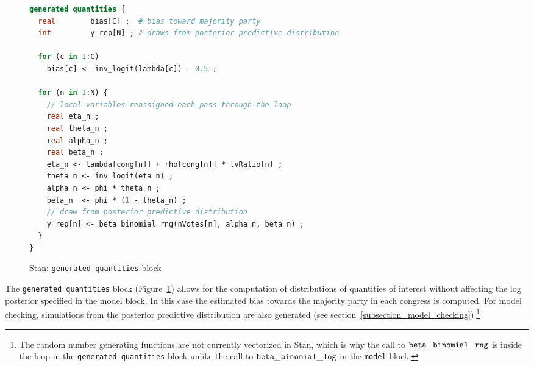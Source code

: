 \begin{figure}[h]
\begin{lstlisting}[language=Stan, frame=trBL]
generated quantities {
  real        bias[C] ;  # bias toward majority party
  int         y_rep[N] ; # draws from posterior predictive distribution
  
  for (c in 1:C) 
    bias[c] <- inv_logit(lambda[c]) - 0.5 ;
  
  for (n in 1:N) {
    // local variables reassigned each pass through the loop
    real eta_n ;
    real theta_n ;
    real alpha_n ;
    real beta_n ;
    eta_n <- lambda[cong[n]] + rho[cong[n]] * lvRatio[n] ;
    theta_n <- inv_logit(eta_n) ;    
    alpha_n <- phi * theta_n ;
    beta_n  <- phi * (1 - theta_n) ;
    // draw from posterior predictive distribution
    y_rep[n] <- beta_binomial_rng(nVotes[n], alpha_n, beta_n) ;
  }
}
\end{lstlisting}
\caption{Stan: {\tt generated quantities} block}
\label{stan_generated_quantities}
\end{figure}

The {\tt generated quantities} block (Figure~\ref{stan_generated_quantities}) allows for the computation of distributions of quantities of interest without affecting the log posterior specified in the model block. In this case the estimated bias towards the majority party in each congress is computed. For model checking, simulations from the posterior predictive distribution are also generated (see section~\ref{subsection_model_checking}).\footnote{The random number generating functions are not currently vectorized in Stan, which is why the call to ${\tt beta\_binomial\_rng}$ is inside the loop in the {\tt generated quantities} block unlike the call to ${\tt beta\_binomial\_log}$ in the {\tt model} block.} 


